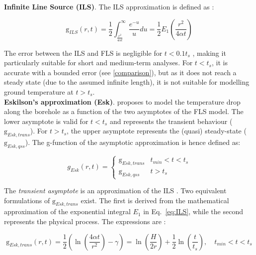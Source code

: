 \textbf{Infinite Line Source (ILS)}. The ILS approximation is defined as \citep{poppel_grenzabstande_2017}:

\begin{equation}
\label{eq:ILS}
    \mathrm{g}_{ILS}(r, t) = \frac{1}{2} \int_\frac{r^2}{4 \alpha t}^\infty \frac{e^{-u}}{u}du 
                  = \frac{1}{2} E_1\left(\frac{r^2}{4 \alpha t}\right)
\end{equation}

The error between the ILS and FLS is negligible for $t < 0.1 t_s$ \citep{claesson_conductive_1988}, making it particularly suitable for short and medium-term analyses. For $t<t_s$, it is accurate with a bounded error (see \ref{comparison}), but as it does not reach a steady state (due to the assumed infinite length), it is not suitable for modelling ground temperature at $t>t_s$.
\\

\textbf{Eskilson's approximation (Esk)}.
\citet{eskilson_thermal_1987} proposes to model the temperature drop along the borehole as a function of the two asymptotes of the FLS model. The lower asymptote is valid for $t < t_s$ and represents the transient behaviour ($\mathrm{g}_{Esk, trans}$). For $t > t_s$, the upper asymptote represents the (quasi) steady-state ($\mathrm{g}_{Esk, qss}$). The g-function of the asymptotic approximation is hence defined as:

\begin{equation}
    g_{Esk}(r, t) = \left\{
        \begin{matrix}
            \mathrm{g}_{Esk, trans} & t_{min} < t < t_s   \\ 
            \mathrm{g}_{Esk, qss}    & t > t_s           
        \end{matrix} 
\right.
\end{equation}

The \textit{transient asymptote} is an approximation of the ILS \citep{wagner_erdwarmesonden._2019}. Two equivalent formulations of $\mathrm{g}_{Esk, trans}$ exist. The first is derived from the mathematical approximation of the exponential integral $E_1$ in Eq.~\ref{eq:ILS}, while the second represents the physical process. The expressions are \citep{pahud_geothermal_2002}: 

\begin{equation}
\label{eq:Esk_trans}
    \mathrm{g}_{Esk, trans}(r, t) = \frac{1}{2} \left(\ln\left(\frac{4 \alpha t}{r^2}\right) - \gamma\right)
                                  = \ln\left(\frac{H}{2 r}\right) + \frac{1}{2} \ln\left(\frac{t}{t_s}\right), \quad
    t_{min} < t < t_s
\end{equation}

